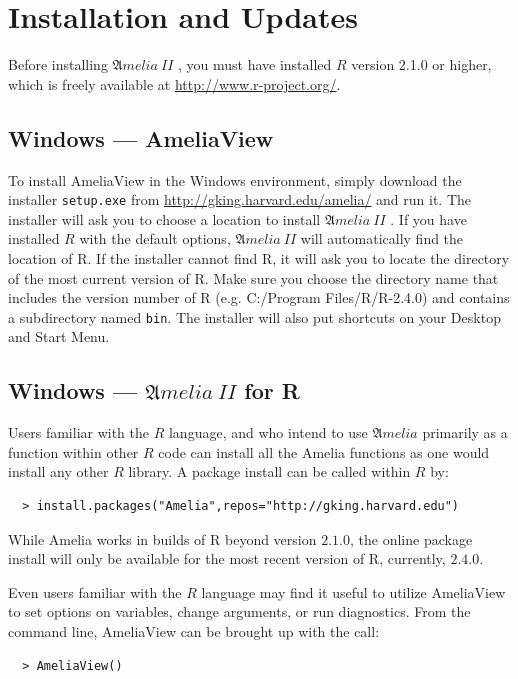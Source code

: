 \documentclass[12pt,titlepage]{article}
\newcommand{\Amelia}{\ensuremath{\mathfrak Amelia} }
\newcommand{\AmeliaII}{\ensuremath{\mathfrak Amelia~II} }
\begin{document}
\section{Installation and Updates}
\label{sec:install}

Before installing \AmeliaII, you must have installed $R$ version 2.1.0
or higher, which is freely available at
\url{http://www.r-project.org/}.
\subsection{Windows --- AmeliaView}
\label{sec:win-install}
To install AmeliaView in the Windows environment, simply download the
installer \texttt{setup.exe} from
\url{http://gking.harvard.edu/amelia/} and run it.  The installer will
ask you to choose a location to install \AmeliaII.  If you have
installed $R$ with the default options, \AmeliaII will automatically
find the location of R.  If the installer cannot find R, it will ask
you to locate the directory of the most current version of R.  Make
sure you choose the directory name that includes the version number of
R (e.g. C:/Program Files/R/R-2.4.0) and contains a subdirectory named
\texttt{bin}.  The installer will also put shortcuts on your Desktop
and Start Menu.

\subsection{Windows --- \AmeliaII for R}

Users familiar with the $R$ language, and who intend to use \Amelia
primarily as a function within other $R$ code can install all the
Amelia functions as one would install any other $R$ library.  A
package install can be called within $R$ by:
  \begin{verbatim}
  > install.packages("Amelia",repos="http://gking.harvard.edu")
  \end{verbatim}
While Amelia works in builds of R beyond version $2.1.0$, the online
package install will only be available for the most recent version of
R, currently, $2.4.0$.


Even users familiar with the $R$ language may find it useful to
utilize AmeliaView to set options on variables, change arguments, or
run diagnostics.  From the command line, AmeliaView can be brought up
with the call:
  \begin{verbatim}
  > AmeliaView()
  \end{verbatim}
\end{document}
